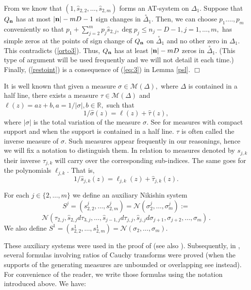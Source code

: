 \documentclass[10pt,a4paper]{article}
\theoremstyle{definition}
\theoremstyle{remark}
\numberwithin{equation}{section}
\begin{document}
From \cite[Theorem 1.1]{FL4II} we know that  $(1,\hat{s}_{2,2},\ldots, \hat{s}_{2,m})$ forms  an AT-system on $\Delta_{1}$. Suppose that $Q_{{\bf n}}$  has at most $\left|{\bf n}\right|-mD -1$ sign changes in   $\stackrel{\circ}{\Delta}_{1}$. Then, we can  choose $p_1.\ldots,p_m$ conveniently so that $p_1 + \sum_{j=2}^m p_j   \widehat{s}_{2,j}, \deg p_j \leq n_j - D -1, j=1,\ldots,m,$ has simple zeros at the points of sign change of $Q_{{\bf n}}$ on $\stackrel{\circ}{\Delta}_{1}$ and no other zero in $\Delta_1$. This contradicts (\ref{orto3}).  Thus, $Q_{{\bf n}}$  has at least  $\left|{\bf n}\right|-mD$ zeros  in   $\stackrel{\circ}{\Delta}_{1}$. (This type of argument will be used frequently and we will not detail it each time.) Finally, (\ref{restoint}) is a consequence of (\ref{eq:3}) in Lemma \ref{psl}.
\hfill $\Box$  \medskip

It is well known that given a measure $\sigma \in {\mathcal{M}}(\Delta),$ where $\Delta$ is contained in a half line, there exists a measure $\tau \in
{\mathcal{M}}(\Delta)$ and ${\ell}(z)=a z+b, a = 1/|\sigma|, b \in {\mathbb{R}},$ such that
\begin{equation} \label{s22}
{1}/{\widehat{\sigma}(z)}={\ell}(z)+ \widehat{\tau}(z),
\end{equation}
where $|\sigma|$ is the total variation of the measure $\sigma.$  See  \cite[Appendix]{KN} for measures with compact support and \cite[Lemma 2.3]{FL4} when the support is contained in a half line. $\tau$  is often called the inverse measure of $\sigma.$  Such measures appear frequently in our reasonings, hence we will fix a notation to distinguish them. In relation to measures  denoted by $s_{j,k}$ their inverse $\tau_{j,k}$ will carry over the corresponding sub-indices. The same goes for the  polynomials $\ell_{j,k}$. That is,
\[
{1}/{\widehat{s}_{j,k}(z)}  ={\ell}_{j,k}(z)+
\widehat{\tau}_{j,k}(z).
\]

For each $j \in \{2, \ldots ,m\}$ we define an auxiliary Nikishin
system
\[ S^j=(s_{2,2}^j, \ldots , s_{2,m}^j)= {\mathcal{N}}(\sigma_2^j,\ldots,\sigma_m^j) :=
\]
\[
{\mathcal{N}}(\tau_{2,j},\widehat{s}_{2,j} d \tau_{3,j}, \ldots ,
\widehat{s}_{j-1,j} d \tau_{j,j}, \widehat{s}_{j,j} d
\sigma_{j+1}, \sigma_{j+2}, \ldots , \sigma_m)\,.
\]
We also define $S^1=(s_{2,2}^1, \ldots , s_{2,m}^1) = {\mathcal{N}}(\sigma_2,\ldots,\sigma_m)$.

These auxiliary systems were used in the proof of \cite[Lemmas 5-6]{Bus} (see also \cite[Theorem 3.1.3]{DrSt2}).
Subsequently,
in \cite[Lemma 3.2]{FL4}, several formulas involving ratios of Cauchy transforms were proved (when the supports of the generating measures are unbounded or overlapping see \cite[Lemma 2.10]{FL4II} instead).
For convenience of the reader, we
write those formulas using the notation introduced above. We have:
\end{document}
